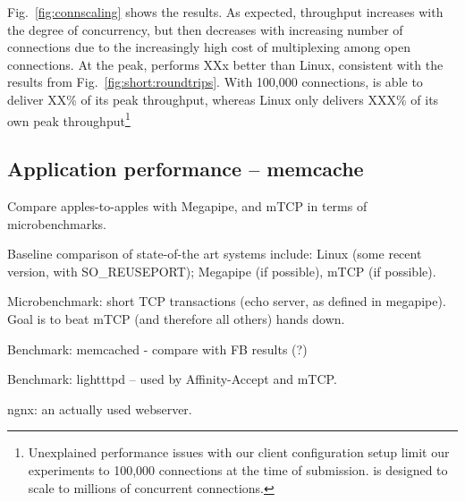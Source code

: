 Fig.~\ref{fig:connscaling} shows the results.  As expected, throughput
increases with the degree of concurrency, but then decreases with
increasing number of connections due to the increasingly high cost of
multiplexing among open connections.  At the peak, \ix performs XXx
better than Linux, consistent with the results from
Fig.~\ref{fig:short:roundtrips}.  With 100,000 connections, \ix is
able to deliver XX\% of its peak throughput, whereas Linux only
delivers XXX\% of its own peak throughput\footnote{Unexplained
  performance issues with our client configuration setup limit our
  experiments to 100,000 connections at the time of submission. \ix is
  designed to scale to millions of concurrent connections.}


\subsection{Application performance -- memcache}
\label{sec:eval:memcache}

\todo Compare apples-to-apples with Megapipe, and mTCP in terms of microbenchmarks.

\todo Baseline comparison of state-of-the art systems include:  Linux (some recent version, with SO\_REUSEPORT); Megapipe (if possible), mTCP (if possible). 

\todo Microbenchmark: short TCP transactions (echo server, as defined in megapipe).   Goal is to beat mTCP (and therefore all others) hands down.

\todo Benchmark: memcached - compare with FB results (?)

\todo Benchmark: lightttpd -- used by Affinity-Accept and mTCP.  

\todo ngnx: an actually used webserver.




